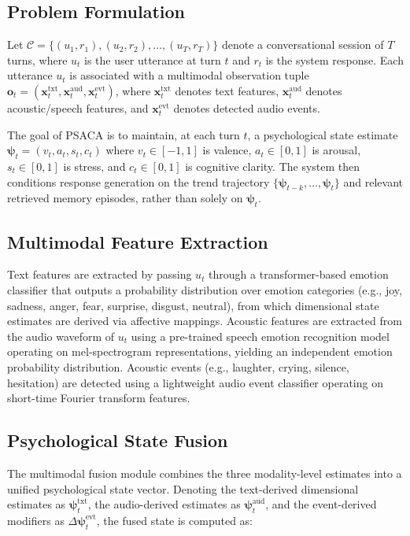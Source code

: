\documentclass[conference]{IEEEtran}
\begin{document}
\subsection{Problem Formulation}

Let $\mathcal{C} = \{(u_1, r_1), (u_2, r_2), \ldots, (u_T, r_T)\}$ denote a conversational session of $T$ turns, where $u_t$ is the user utterance at turn $t$ and $r_t$ is the system response. Each utterance $u_t$ is associated with a multimodal observation tuple $\mathbf{o}_t = (\mathbf{x}^{\text{txt}}_t, \mathbf{x}^{\text{aud}}_t, \mathbf{x}^{\text{evt}}_t)$, where $\mathbf{x}^{\text{txt}}_t$ denotes text features, $\mathbf{x}^{\text{aud}}_t$ denotes acoustic/speech features, and $\mathbf{x}^{\text{evt}}_t$ denotes detected audio events.

The goal of PSACA is to maintain, at each turn $t$, a psychological state estimate $\boldsymbol{\psi}_t = (v_t, a_t, s_t, c_t)$ where $v_t \in [-1, 1]$ is valence, $a_t \in [0, 1]$ is arousal, $s_t \in [0, 1]$ is stress, and $c_t \in [0, 1]$ is cognitive clarity. The system then conditions response generation on the trend trajectory $\{\boldsymbol{\psi}_{t-k}, \ldots, \boldsymbol{\psi}_t\}$ and relevant retrieved memory episodes, rather than solely on $\boldsymbol{\psi}_t$.

\subsection{Multimodal Feature Extraction}

Text features are extracted by passing $u_t$ through a transformer-based emotion classifier that outputs a probability distribution over emotion categories (e.g., joy, sadness, anger, fear, surprise, disgust, neutral), from which dimensional state estimates are derived via affective mappings. Acoustic features are extracted from the audio waveform of $u_t$ using a pre-trained speech emotion recognition model operating on mel-spectrogram representations, yielding an independent emotion probability distribution. Acoustic events (e.g., laughter, crying, silence, hesitation) are detected using a lightweight audio event classifier operating on short-time Fourier transform features.

\subsection{Psychological State Fusion}

The multimodal fusion module combines the three modality-level estimates into a unified psychological state vector. Denoting the text-derived dimensional estimates as $\boldsymbol{\psi}^{\text{txt}}_t$, the audio-derived estimates as $\boldsymbol{\psi}^{\text{aud}}_t$, and the event-derived modifiers as $\Delta\boldsymbol{\psi}^{\text{evt}}_t$, the fused state is computed as:
\end{document}
